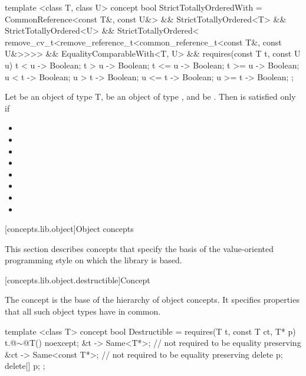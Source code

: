 \begin{itemdecl}
template <class T, class U>
concept bool StrictTotallyOrderedWith =
  CommonReference<const T&, const U&> &&
  StrictTotallyOrdered<T> &&
  StrictTotallyOrdered<U> &&
  StrictTotallyOrdered<
    remove_cv_t<remove_reference_t<common_reference_t<const T&, const U&>>>> &&
  EqualityComparableWith<T, U> &&
  requires(const T t, const U u) {
    { t < u } -> Boolean;
    { t > u } -> Boolean;
    { t <= u } -> Boolean;
    { t >= u } -> Boolean;
    { u < t } -> Boolean;
    { u > t } -> Boolean;
    { u <= t } -> Boolean;
    { u >= t } -> Boolean;
  };
\end{itemdecl}

\begin{itemdescr}
\pnum
Let  be an object of type T,  be an object
of type , and  be
.
Then  is satisfied only if

\begin{itemize}
\item {}
\item {}
\item {}
\item {}
\item {}
\item {}
\item {}
\item {}
\end{itemize}
\end{itemdescr}

[concepts.lib.object]{Object concepts}

\pnum
This section describes concepts that specify the basis of the
value-oriented programming style on which the library is based.

[concepts.lib.object.destructible]{Concept }

\pnum
The  concept is the base of the hierarchy of object concepts.
It specifies properties that all such object types have in common.

%
\begin{itemdecl}
template <class T>
concept bool Destructible =
  requires(T t, const T ct, T* p) {
    { t.@$\sim$@T() } noexcept;
    { &t } -> Same<T*>; // not required to be equality preserving
    { &ct } -> Same<const T*>; // not required to be equality preserving
    delete p;
    delete[] p;
  };
\end{itemdecl}

